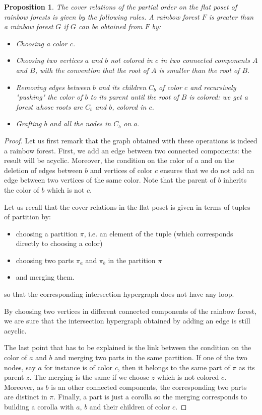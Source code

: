 \documentclass{amsart}
\newtheorem{proposition}[theorem]{Proposition}
\theoremstyle{definition}
\begin{document}
\begin{proposition}
The cover relations of the partial order on the flat poset of rainbow forests is given by the following rules. A rainbow forest $F$ is greater than a rainbow forest $G$ if $G$ can be obtained from $F$ by:
\begin{itemize}
\item Choosing a color $c$.
\item Choosing two vertices $a$ and $b$ not colored in $c$ in two connected components $A$ and $B$, with the convention that the root of $A$ is smaller than the root of $B$.
\item Removing edges between $b$ and its children $C_b$ of color $c$ and recursively "pushing" the color of $b$ to its parent until the root of $B$ is colored: we get a forest whose roots are $C_b$ and $b$, colored in $c$.
\item Grafting $b$ and all the nodes in $C_b$ on $a$.
\end{itemize}
\end{proposition}

\begin{proof}
Let us first remark that the graph obtained with these operations is indeed a rainbow forest. First, we add an edge between two connected components: the result will be acyclic. Moreover, the condition on the color of $a$ and on the deletion of edges between $b$ and vertices of color $c$ ensures that we do not add an edge between two vertices of the same color. Note that the parent of $b$ inherits the color of $b$ which is not $c$.

Let us recall that the cover relations in the flat poset is given in terms of tuples of partition by:
\begin{itemize}
\item choosing a partition $\pi$, i.e. an element of the tuple (which corresponds directly to choosing a color)
\item choosing two parts $\pi_a$ and $\pi_b$ in the partition $\pi$
\item and merging them.
\end{itemize}
so that the corresponding intersection hypergraph does not have any loop.

By choosing two vertices in different connected components of the rainbow forest, we are sure that the intersection hypergraph obtained by adding an edge is still acyclic.

The last point that has to be explained is the link between the condition on the color of $a$ and $b$ and merging two parts in the same partition. If one of the two nodes, say $a$ for instance is of color $c$, then it belongs to the same part of $\pi$ as its parent $z$. The merging is the same if we choose $z$ which is not colored $c$. Moreover, as $b$ is an other connected components, the corresponding two parts are distinct in $\pi$. Finally, a part is just a corolla so the merging corresponds to building a corolla with $a$, $b$ and their children of color $c$.
\end{proof}
\end{document}
